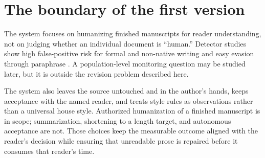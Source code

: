 \section{The boundary of the first version}

The system focuses on humanizing finished manuscripts for reader understanding,
not on judging whether an individual document is ``human.''
Detector studies show high
false-positive risk for formal and non-native writing and easy evasion through paraphrase
\citep{liang2023detectors,weberwulff2023testing,krishna2023paraphrasing}. A
population-level monitoring question may be studied later, but it is outside
the revision problem described here.

The system also leaves the source untouched and in the author's hands, keeps
acceptance with the named reader, and treats style rules as observations rather
than a universal house style. Authorized humanization of a finished manuscript is
in scope; summarization, shortening to a length target, and autonomous acceptance
are not. Those choices keep the measurable outcome aligned with the reader's
decision while ensuring that unreadable prose is repaired before it consumes that
reader's time.
